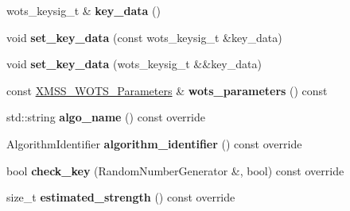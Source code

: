\begin{DoxyCompactItemize}
\mbox{\label{class_botan_1_1_x_m_s_s___w_o_t_s___public_key_aa5ca3163c0b51419b3d6c573ced14c97}} 
wots\+\_\+keysig\+\_\+t \& {\bfseries key\+\_\+data} ()
\item 
\mbox{\label{class_botan_1_1_x_m_s_s___w_o_t_s___public_key_acc0a23af03f8f0769b7a607b68f6bd3b}} 
void {\bfseries set\+\_\+key\+\_\+data} (const wots\+\_\+keysig\+\_\+t \&key\+\_\+data)
\item 
\mbox{\label{class_botan_1_1_x_m_s_s___w_o_t_s___public_key_af638326b904101d67151f39d29a1a892}} 
void {\bfseries set\+\_\+key\+\_\+data} (wots\+\_\+keysig\+\_\+t \&\&key\+\_\+data)
\item 
\mbox{\label{class_botan_1_1_x_m_s_s___w_o_t_s___public_key_ad29785971c1dc7421c98b04013220836}} 
const \hyperlink{class_botan_1_1_x_m_s_s___w_o_t_s___parameters}{X\+M\+S\+S\+\_\+\+W\+O\+T\+S\+\_\+\+Parameters} \& {\bfseries wots\+\_\+parameters} () const
\item 
\mbox{\label{class_botan_1_1_x_m_s_s___w_o_t_s___public_key_aa712ab07c9c77f8468eacb066b16a8bb}} 
std\+::string {\bfseries algo\+\_\+name} () const override
\item 
\mbox{\label{class_botan_1_1_x_m_s_s___w_o_t_s___public_key_a9a0d689a30069a8f1875eb8fce3cda0e}} 
Algorithm\+Identifier {\bfseries algorithm\+\_\+identifier} () const override
\item 
\mbox{\label{class_botan_1_1_x_m_s_s___w_o_t_s___public_key_a9e700bca0fc8527fd85815371acfc6d2}} 
bool {\bfseries check\+\_\+key} (Random\+Number\+Generator \&, bool) const override
\item 
\mbox{\label{class_botan_1_1_x_m_s_s___w_o_t_s___public_key_a7aa41153ba1027d3f821c2803468b051}} 
size\+\_\+t {\bfseries estimated\+\_\+strength} () const override
\item 
\mbox{\label{class_botan_1_1_x_m_s_s___w_o_t_s___public_key_a73c7ca8dfd51b5d8f2506c7ed905fd56}} 

\end{DoxyCompactItemize}
